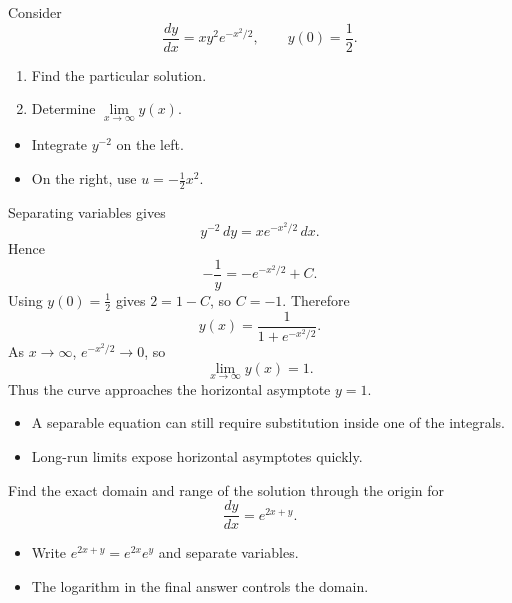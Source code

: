 \begin{problem}
Consider
\[
\frac{dy}{dx}=xy^2e^{-x^2/2}, \qquad y(0)=\frac12.
\]
\begin{enumerate}
    \item[\textbf{i}] Find the particular solution.
    \item[\textbf{ii}] Determine $\lim\limits_{x\to\infty}y(x)$.
\end{enumerate}
\end{problem}

\begin{hint}
\begin{itemize}[leftmargin=*]
    \item Integrate $y^{-2}$ on the left.
    \item On the right, use $u=-\frac12x^2$.
\end{itemize}
\end{hint}

\begin{solution}
Separating variables gives
\[
y^{-2}\,dy=xe^{-x^2/2}\,dx.
\]
Hence
\[
-\frac1y=-e^{-x^2/2}+C.
\]
Using $y(0)=\frac12$ gives $2=1-C$, so $C=-1$. Therefore
\[
\boxed{y(x)=\frac{1}{1+e^{-x^2/2}}}.
\]
As $x\to\infty$, $e^{-x^2/2}\to0$, so
\[
\lim_{x\to\infty}y(x)=1.
\]
Thus the curve approaches the horizontal asymptote $y=1$.
\end{solution}

\begin{takeaways}
\begin{itemize}[leftmargin=*]
    \item A separable equation can still require substitution inside one of the integrals.
    \item Long-run limits expose horizontal asymptotes quickly.
\end{itemize}
\end{takeaways}

\begin{problem}
Find the exact domain and range of the solution through the origin for
\[
\frac{dy}{dx}=e^{2x+y}.
\]
\end{problem}

\begin{hint}
\begin{itemize}[leftmargin=*]
    \item Write $e^{2x+y}=e^{2x}e^y$ and separate variables.
    \item The logarithm in the final answer controls the domain.
\end{itemize}
\end{hint}

